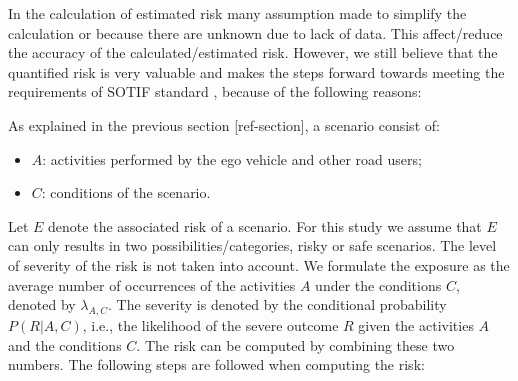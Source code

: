 \color{red}
In the calculation of estimated risk many assumption made to simplify the calculation or because there are unknown due to lack of data. This affect/reduce the accuracy of the calculated/estimated risk. 
However, we still believe that the quantified risk is very valuable and makes the steps forward towards meeting the requirements of SOTIF standard , because of the following reasons:
\color{black}
As explained in the previous section [ref-section], a scenario consist of:
\begin{itemize}
	\item $A$: activities performed by the ego vehicle and other road users;
	\item $C$: conditions of the scenario.
\end{itemize}
Let $E$ denote the associated risk of a scenario. For this study we assume that $E$ can only results in two possibilities/categories, risky or safe scenarios. The level of severity of the risk is not taken into account. We formulate the exposure as the average number of occurrences of the activities $A$ under the conditions $C$, denoted by $\lambda_{A,C}$. The severity is denoted by the conditional probability $P(R|A,C)$, i.e., the likelihood of the severe outcome $R$ given the activities $A$ and the conditions $C$. The risk can be computed by combining these two numbers. The following steps are followed when computing the risk:

